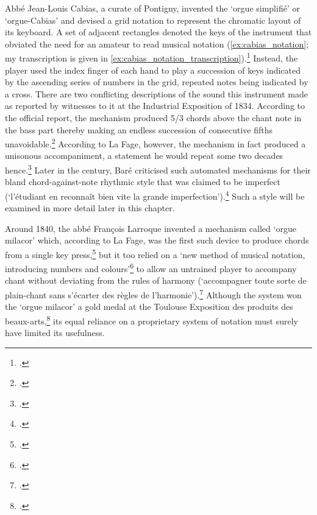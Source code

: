 Abbé Jean-Louis Cabias, a curate of Pontigny, invented the `orgue simplifié' or `orgue-Cabias' and devised a grid notation to represent the chromatic layout of its keyboard.
A set of adjacent rectangles denoted the keys of the instrument that obviated the need for an amateur to read musical notation (\cref{ex:cabias_notation}; my transcription is given in \cref{ex:cabias_notation_transcription}).\footcite[p.~198, musical supplement fig.~1]{LaFageOrgueCabias1834}
Instead, the player used the index finger of each hand to play a succession of keys indicated by the ascending series of numbers in the grid, repeated notes being indicated by a cross.
There are two conflicting descriptions of the sound this instrument made as reported by witnesses to it at the Industrial Exposition of 1834.
According to the official report, the mechanism produced 5/3 chords above the chant note in the bass part thereby making an endless succession of consecutive fifths unavoidable.\footcite[208--209]{FrancoeurRapportfaitpar1831}
According to La Fage, however, the mechanism in fact produced a unisonous accompaniment, a statement he would repeat some two decades hence.\footnote{\cites[198]{LaFageOrgueCabias1834}[148]{LaFageQuinzevisitesmusicales1856}.}
Later in the century, Baré criticised such automated mechanisms for their bland chord-against-note rhythmic style that was claimed to be imperfect (`l'étudiant en reconnaît bien vite la grande imperfection').\footcite[6]{BareNouvellemethodesimple1884}
Such a style will be examined in more detail later in this chapter.
\nowidow[2]

Around 1840, the abbé François Larroque invented a mechanism called `orgue milacor' which, according to La Fage, was the first such device to produce chords from a single key press,\footcite[145]{LaFageQuinzevisitesmusicales1856} but it too relied on a `new method of musical notation, introducing numbers and colours'\footcite[89]{HughesNilesNationalRegister1840} to allow an untrained player to accompany chant without deviating from the rules of harmony (`accompagner toute sorte de plain-chant sans s'écarter des règles de l'harmonie').\footcite[486]{deMerlineuxMemorialencyclopediqueprogressif1839}
Although the system won the `orgue milacor' a gold medal at the Toulouse Exposition des produits des beaux-arts,\footcite[115--6]{Expositionproduitsbeauxarts1840} its equal reliance on a proprietary system of notation must surely have limited its usefulness.

